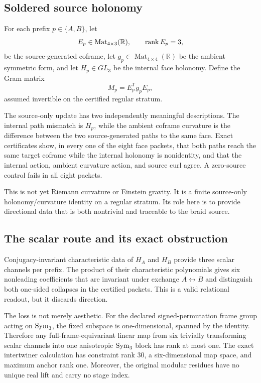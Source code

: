 \subsection{Soldered source holonomy}

For each prefix $p\in\{A,B\}$, let
\[
 E_p\in\operatorname{Mat}_{4\times3}(\mathbb R),\qquad
 \operatorname{rank} E_p=3,
\]
be the source-generated coframe, let $g_p\in\operatorname{Mat}_{4\times4}(\mathbb R)$ be the ambient symmetric form, and let $H_p\in GL_3$ be the internal face holonomy. Define the Gram matrix
\begin{equation}\label{eq:gram}
 M_p=E_p^{\mathsf T}g_pE_p,
\end{equation}
assumed invertible on the certified regular stratum.

The source-only update has two independently meaningful descriptions. The internal path mismatch is $H_p$, while the ambient coframe curvature is the difference between the two source-generated paths to the same face. Exact certificates show, in every one of the eight face packets, that both paths reach the same target coframe while the internal holonomy is nonidentity, and that the internal action, ambient curvature action, and source curl agree. A zero-source control fails in all eight packets.

This is not yet Riemann curvature or Einstein gravity. It is a finite source-only holonomy/curvature identity on a regular stratum. Its role here is to provide directional data that is both nontrivial and traceable to the braid source.

\subsection{The scalar route and its exact obstruction}

Conjugacy-invariant characteristic data of $H_A$ and $H_B$ provide three scalar channels per prefix. The product of their characteristic polynomials gives six nonleading coefficients that are invariant under exchange $A\leftrightarrow B$ and distinguish both one-sided collapses in the certified packets. This is a valid relational readout, but it discards direction.

The loss is not merely aesthetic. For the declared signed-permutation frame group acting on $\operatorname{Sym}_3$, the fixed subspace is one-dimensional, spanned by the identity. Therefore any full-frame-equivariant linear map from six trivially transforming scalar channels into one anisotropic $\operatorname{Sym}_3$ block has rank at most one. The exact intertwiner calculation has constraint rank 30, a six-dimensional map space, and maximum anchor rank one. Moreover, the original modular residues have no unique real lift and carry no stage index.

